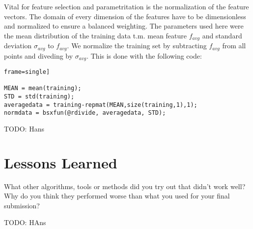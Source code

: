 \documentclass[a4paper, 11pt]{article}
\begin{document}
Vital for feature selection and parametritation is the normalization of the feature vectors. The domain of every dimension of the features have to be dimensionless and normalized 
to ensure a balanced weighting. The parameters used here were the mean distribution of the training data t.m. mean feature $f_{avg}$ and standard deviation $\sigma_{avg}$ to $f_{avg}$. We normalize the training set by subtracting $f_{avg}$ from all points and diveding by $\sigma_{avg}$. This is done with the following code:

\begin{lstlisting}frame=single]

MEAN = mean(training);
STD = std(training);
averagedata = training-repmat(MEAN,size(training,1),1);
normdata = bsxfun(@rdivide, averagedata, STD);
\end{lstlisting}

TODO: Hans

\section{Lessons Learned} What other algorithms, tools or methods did you try out that didn't work well?
Why do you think they performed worse than what you used for your final submission?

TODO: HAns
\end{document}
